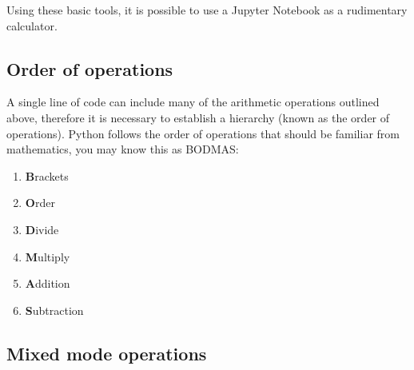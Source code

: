 \documentclass[a4paper]{article}
\begin{document}
Using these basic tools, it is possible to use a Jupyter Notebook as a rudimentary calculator. 

\subsection{Order of operations}

A single line of code can include many of the arithmetic operations outlined above, therefore it is necessary to establish a hierarchy (known as the order of operations). 
Python follows the order of operations that should be familiar from mathematics, you may know this as BODMAS: 
\begin{enumerate}
	\item{\textbf{B}rackets}
	\item{\textbf{O}rder}
	\item{\textbf{D}ivide}
	\item{\textbf{M}ultiply}
	\item{\textbf{A}ddition}
	\item{\textbf{S}ubtraction}
\end{enumerate}
\vspace{\baselineskip}
\begin{center}
	\noindent{}
\end{center}

\subsection{Mixed mode operations}
\end{document}
